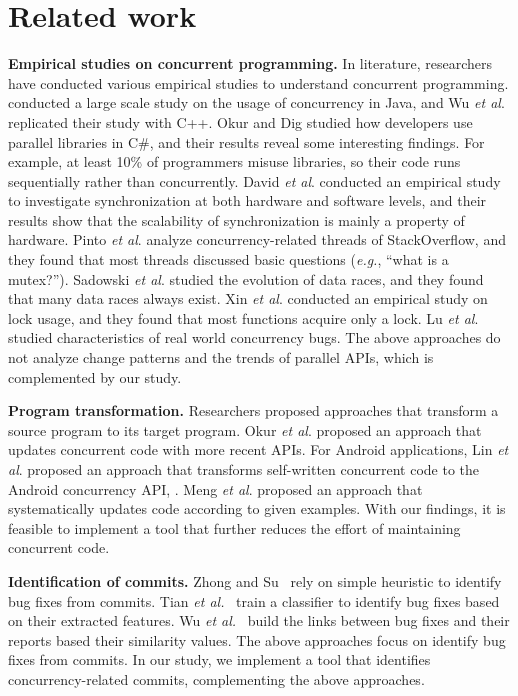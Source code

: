 \section{Related work}
\label{sec:related}
\noindent
\textbf{Empirical studies on concurrent programming.} In literature, researchers have conducted various empirical studies to understand concurrent programming. \cite{journals/jss/PintoTFFB15} conducted a large scale study on the usage of concurrency in Java, and Wu \textit{et al}. \cite{journals/infsof/WuCZX16} replicated their study with C++. Okur and Dig \cite{conf/sigsoft/OkurD12} studied how developers use parallel libraries in C\#, and their results reveal some interesting findings. For example, at least 10\% of programmers misuse libraries, so their code runs sequentially rather than concurrently. David \textit{et al}. \cite{conf/sosp/DavidGT13} conducted an empirical study to investigate synchronization at both hardware and software levels, and their results show that the scalability of synchronization is mainly a property of hardware. Pinto \textit{et al}. \cite{conf/oopsla/PintoTC15} analyze concurrency-related threads of StackOverflow, and they found that most threads discussed basic questions (\emph{e.g.}, ``what is a mutex?''). Sadowski \textit{et al}. \cite{conf/msr/SadowskiYK12} studied the evolution of data races, and they found that many data races always exist. Xin \textit{et al}. \cite{conf/icsm/XinQHXZWG13} conducted an empirical study on lock usage, and they found that most functions acquire only a lock. Lu \textit{et al}. \cite{conf/asplos/LuPSZ08} studied characteristics of real world concurrency bugs. The above approaches do not analyze change patterns and the trends of parallel APIs, which is complemented by our study.

\noindent
\textbf{Program transformation.} Researchers proposed approaches that transform a source program to its target program. Okur \textit{et al}. \cite{conf/ecoop/OkurED14} proposed an approach that updates concurrent code with more recent APIs. For Android applications, Lin \textit{et al}. \cite{conf/sigsoft/LinRD14} proposed an approach that transforms self-written concurrent code to the Android concurrency API, . Meng \textit{et al}. \cite{conf/pldi/MengKM11} proposed an approach that systematically updates code according to given examples. With our findings, it is feasible to implement a tool that further reduces the effort of maintaining concurrent code.

\noindent
\textbf{Identification of commits.} Zhong and Su~\cite{zhong2015bugfix} rely on simple heuristic to identify bug fixes from commits. Tian \emph{et al.}~\cite{tian2012identifying} train a classifier to identify bug fixes based on their extracted features. Wu \emph{et al.}~\cite{wu2011relink} build the links between bug fixes and their reports based their similarity values. The above approaches focus on identify bug fixes from commits. In our study, we implement a tool that identifies concurrency-related commits, complementing the above approaches. 
